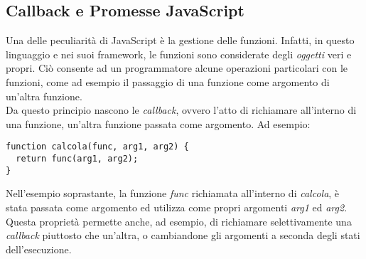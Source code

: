 \subsection{Callback e Promesse JavaScript}
Una delle peculiarità di JavaScript è la gestione delle funzioni. Infatti, in questo linguaggio e nei suoi framework, le funzioni sono considerate degli \emph{oggetti} veri e propri. Ciò consente ad un programmatore alcune operazioni particolari con le funzioni, come ad esempio il passaggio di una funzione come argomento di un'altra funzione.\\
Da questo principio nascono le \emph{callback}, ovvero l'atto di richiamare all'interno di una funzione, un'altra funzione passata come argomento. Ad esempio:
\begin{verbatim}
function calcola(func, arg1, arg2) {
  return func(arg1, arg2);
}
\end{verbatim}
Nell'esempio soprastante, la funzione \emph{func} richiamata all'interno di \emph{calcola}, è stata passata come argomento ed utilizza come propri argomenti \emph{arg1} ed \emph{arg2}. Questa proprietà permette anche, ad esempio, di richiamare selettivamente una \emph{callback} piuttosto che un'altra, o cambiandone gli argomenti a seconda degli stati dell'esecuzione.  
